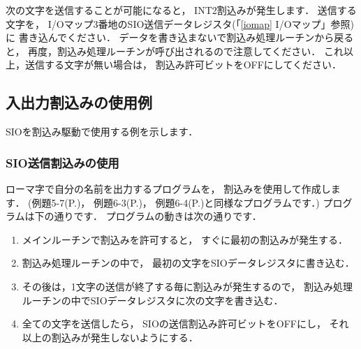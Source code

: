 次の文字を送信することが可能になると，
INT2割込みが発生します．
送信する文字を，
I/Oマップ3番地のSIO送信データレジスタ(「\ref{iomap} I/Oマップ」参照)に
書き込んでください．
データを書き込まないで割込み処理ルーチンから戻ると，
再度，割込み処理ルーチンが呼び出されるので注意してください．
これ以上，送信する文字が無い場合は，
割込み許可ビットをOFFにしてください．

\subsection{入出力割込みの使用例}

SIOを割込み駆動で使用する例を示します．

\subsubsection{SIO送信割込みの使用}

ローマ字で自分の名前を出力するプログラムを，
割込みを使用して作成します．
(例題5-7(P.\pageref{rei:5_7})，
例題6-3(P.\pageref{rei:6_3})，
例題6-4(P.\pageref{rei:6_4})と同様なプログラムです．)
プログラムは下の通りです．
プログラムの動きは次の通りです．

\begin{enumerate}

\item メインルーチンで割込みを許可すると，
すぐに最初の割込みが発生する．

\item 割込み処理ルーチンの中で，
最初の文字をSIOデータレジスタに書き込む．

\item その後は，1文字の送信が終了する毎に割込みが発生するので，
割込み処理ルーチンの中でSIOデータレジスタに次の文字を書き込む．

\item 全ての文字を送信したら，
SIOの送信割込み許可ビットをOFFにし，
それ以上の割込みが発生しないようにする．

\end{enumerate}

